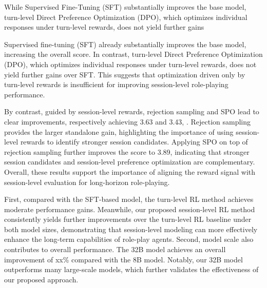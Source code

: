 While Supervised Fine-Tuning (SFT) substantially improves the base model, turn-level Direct Preference Optimization (DPO), which optimizes individual responses under turn-level rewards, does not yield further gains

Supervised fine-tuning (SFT) already substantially improves the base model, increasing the overall score. In contrast, turn-level Direct Preference Optimization (DPO), which optimizes individual responses under turn-level rewards, does not yield further gains over SFT. This suggests that optimization driven only by turn-level rewards is insufficient for improving session-level role-playing performance.




By contrast, guided by session-level rewards,  rejection sampling and SPO lead to clear improvements, respectively achieving 3.63 and 3.43, . Rejection sampling provides the larger standalone gain, highlighting the importance of using session-level rewards to identify stronger session candidates. Applying SPO on top of rejection sampling further improves the score to 3.89, indicating that stronger session candidates and session-level preference optimization are complementary. Overall, these results support the importance of aligning the reward signal with session-level evaluation for long-horizon role-playing.

First, compared with the SFT-based model, the turn-level RL method achieves moderate performance gains. Meanwhile, our proposed session-level RL method consistently yields further improvements over the turn-level RL baseline under both model sizes, demonstrating that session-level modeling can more effectively enhance the long-term capabilities of role-play agents.
Second, model scale also contributes to overall performance. The 32B model achieves an overall improvement of xx\% compared with the 8B model. Notably, our 32B model outperforms many large-scale models, which further validates the effectiveness of our proposed approach.



















